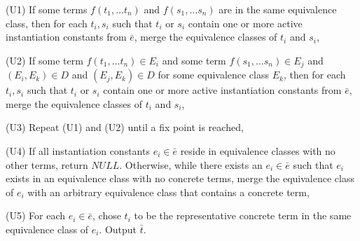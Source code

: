 \documentclass{llncs}
\begin{document}
(U1)  If some terms $f( t_1, \ldots t_n )$ and $f( s_1, \ldots s_n )$ are in the same equivalence class, then for each $t_i, s_i$ such that $t_i$ or $s_i$ contain one or more active instantiation constants from $\bar{e}$, merge the equivalence classes of $t_i$ and $s_i$,

(U2)  If some term $f( t_1, \ldots t_n ) \in E_i$ and some term $f( s_1, \ldots s_n ) \in E_j$ and $( E_i, E_k ) \in D$ and $( E_j, E_k ) \in D$ for some equivalence class $E_k$, then for each $t_i, s_i$ such that $t_i$ or $s_i$ contain one or more active instantiation constants from $\bar{e}$, merge the equivalence classes of $t_i$ and $s_i$,

(U3) Repeat (U1) and (U2) until a fix point is reached,

(U4)  If all instantiation constants $e_i \in \bar{e}$ reside in equivalence classes with no other terms, return $NULL$.
Otherwise, while there exists an $e_i \in \bar{e}$ such that $e_i$ exists in an equivalence class with no concrete terms, merge the equivalence class of $e_i$ with an arbitrary equivalence class that contains a concrete term,

(U5) For each $e_i \in \bar{e}$, chose $t_i$ to be the representative concrete term in the same equivalence class of $e_i$. 
Output $\bar{t}$.  \\




\end{document}
